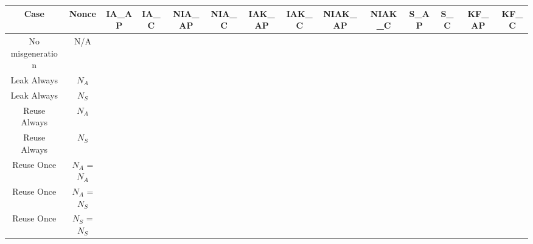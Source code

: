\documentclass[crop]{standalone}
\newcommand{\noattack}{\color{ForestGreen}\usym{2713}\color{black}}
\begin{document}
\parbox{30cm}{
\begin{tabular}{|c|c|c|c|c|c|c|c|c|c|c|c|c|c|}
\hline
Case & Nonce & IA\_AP & IA\_C & NIA\_AP & NIA\_C & IAK\_AP & IAK\_C & NIAK\_AP & NIAK\_C & S\_AP & S\_C & KF\_AP & KF\_C \\ \hline
No misgeneration & N/A & \noattack & \noattack & \noattack & \noattack & \noattack & \noattack & \noattack & \noattack & \noattack & \noattack & \noattack & \noattack\\ \hline
Leak Always & $N_A$ & \noattack & \noattack & \noattack & \noattack & \noattack & \noattack & \noattack & \noattack & \noattack & \noattack & \noattack & \noattack\\ \hline
Leak Always & $N_S$ & \noattack & \noattack & \noattack & \noattack & \noattack & \noattack & \noattack & \noattack & \noattack & \noattack & \noattack & \noattack\\ \hline
Reuse Always & $N_A$ & \noattack & \noattack & \noattack & \noattack & \noattack & \noattack & \noattack & \noattack & \noattack & \noattack & \noattack & \noattack\\ \hline
Reuse Always & $N_S$ & \noattack & \noattack & \noattack & \noattack & \noattack & \noattack & \noattack & \noattack & \noattack & \noattack & \noattack & \noattack\\ \hline
Reuse Once & $N_A$ = $N_A$ & \noattack & \noattack & \noattack & \noattack & \noattack & \noattack & \noattack & \noattack & \noattack & \noattack & \noattack & \noattack\\ \hline
Reuse Once & $N_A$ = $N_S$ & \noattack & \noattack & \noattack & \noattack & \noattack & \noattack & \noattack & \noattack & \noattack & \noattack & \noattack & \noattack\\ \hline
Reuse Once & $N_S$ = $N_S$ & \noattack & \noattack & \noattack & \noattack & \noattack & \noattack & \noattack & \noattack & \noattack & \noattack & \noattack & \noattack\\ \hline
\end{tabular}}
\end{document}
